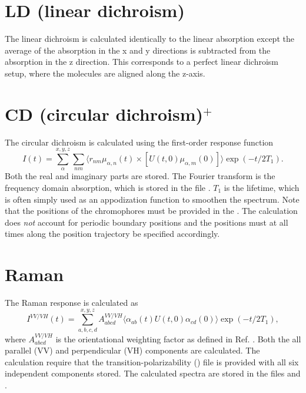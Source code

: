 \section{LD (linear dichroism)}
The linear dichroism is calculated identically to the linear absorption except the average of the absorption in the x and y directions is subtracted from the absorption in the z direction.
This corresponds to a perfect linear dichroism setup, where the molecules are aligned along the z-axis.

\section{CD (circular dichroism)$^{+}$}
The circular dichroism is calculated using the first-order response function
\begin{equation}
	I(t)=\sum_{\alpha}^{x,y,z}\sum_{nm}\langle r_{nm}\mu_{\alpha,n}(t)\times[U(t,0)\mu_{\alpha,m}(0)]\rangle\exp(-t/2T_1).
\end{equation}
Both the real and imaginary parts are stored.
The Fourier transform is the frequency domain absorption, which is stored in the file .
$T_1$ is the lifetime, which is often simply used as an appodization function to smoothen the spectrum.
Note that the positions of the chromophores must be provided in the .
The calculation does \textit{not} account for periodic boundary positions and the positions must at all times along the position trajectory be specified accordingly.

\section{Raman}
The Raman response is calculated as \cite{Torii.2002.J.Phys.Chem.A.106.3281,Shi.2012.J.Phys.Chem.B.116.13821}
\begin{equation}
        I^{VV/VH}(t)=\sum_{a,b,c,d}^{x,y,z}A^{VV/VH}_{abcd}\langle\alpha_{ab}(t)U(t,0)\alpha_{cd}(0)\rangle\exp(-t/2T_1),
\end{equation}
where $A^{VV/VH}_{abcd}$ is the orientational weighting factor as defined in Ref. . 
Both the all parallel (VV) and perpendicular (VH) components are calculated.
The calculation require that the transition-polarizability () file is provided with all six independent components stored.
The calculated spectra are stored in the files  and .

